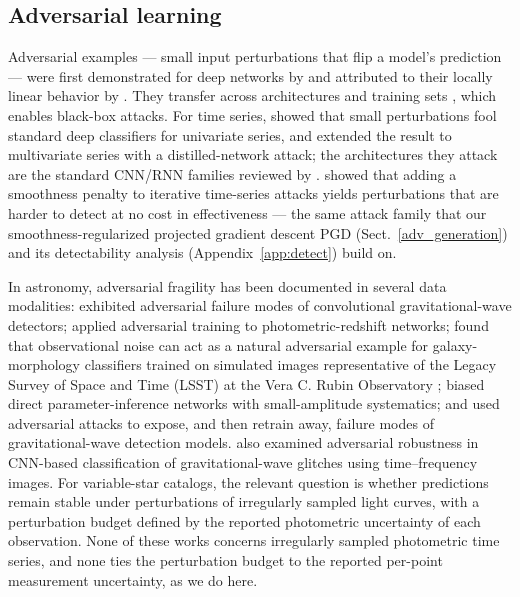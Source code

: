 \documentclass{aa}
\begin{document}
\subsection{Adversarial learning}
\label{adversarial}

Adversarial examples --- small input perturbations that flip a model's
prediction --- were first demonstrated for deep networks by
\citet{szegedy2013intriguing} and attributed to their locally linear
behavior by \citet{goodfellow2014explaining}. They transfer across
architectures and training sets \citep{papernot2016transferability,
liu2016delving, dong2018boosting}, which enables black-box attacks. For
time series, \citet{fawaz2019adversarial} showed that small perturbations
fool standard deep classifiers for univariate series, and
\citet{karim2020adversarial} extended the result to multivariate series
with a distilled-network attack; the architectures they attack are the
standard CNN/RNN families reviewed by \citet{ismail2019deep}.
\citet{pialla2022smooth, pialla2023time} showed that adding a smoothness
penalty to iterative time-series attacks yields perturbations that are
harder to detect at no cost in effectiveness --- the same attack family
that our smoothness-regularized projected gradient descent PGD (Sect.~\ref{adv_generation}) and its detectability analysis (Appendix~\ref{app:detect}) build on. 

In astronomy, adversarial fragility has been documented in several data modalities:
\citet{gebhard2019convolutional} exhibited adversarial failure modes of
convolutional gravitational-wave detectors; \citet{campagne2020adversarial}
applied adversarial training to photometric-redshift networks;
\citet{ciprijanovic2021robustness} found that observational noise can act
as a natural adversarial example for galaxy-morphology classifiers
trained on simulated images representative of the Legacy Survey
of Space and Time (LSST) at the Vera C. Rubin Observatory \citep{ivezic2019lsst};
\citet{horowitz2022plausible} biased direct parameter-inference networks
with small-amplitude systematics; and \citet{jadhav2023towards} used
adversarial attacks to expose, and then retrain away, failure modes of
gravitational-wave detection models. \citet{bhandari2025interpreting} also examined adversarial robustness in CNN-based classification of gravitational-wave glitches using time--frequency images. For variable-star catalogs, the relevant question is whether predictions remain stable under perturbations of irregularly sampled light curves, with a perturbation budget defined by the reported photometric uncertainty of each observation. None of these works concerns
irregularly sampled photometric time series, and none ties the
perturbation budget to the reported per-point measurement uncertainty, as we do here.
\end{document}
